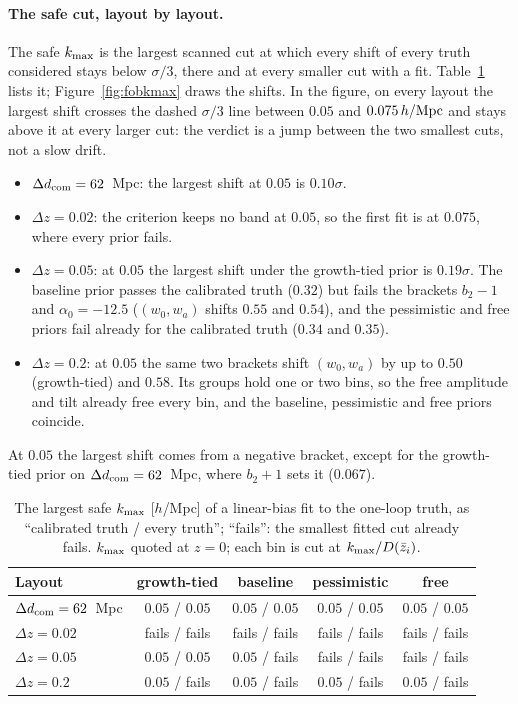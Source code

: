 \documentclass[11pt]{article}
\newcommand{\kmax}{k_{\rm max}}
\newcommand{\hMpc}{\,h/{\rm Mpc}}
\newcommand{\kmaxclause}{$\kmax$ quoted at $z = 0$; each bin is cut at
  $\kmax/D(\bar{z}_i)$.}
\begin{document}
\paragraph{The safe cut, layout by layout.}
The safe $\kmax$ is the largest scanned cut at which every shift of
every truth considered stays below $\sigma/3$, there and at every
smaller cut with a fit.  Table~\ref{tab:safe} lists it;
Figure~\ref{fig:fobkmax} draws the shifts.  In the figure, on every
layout the largest shift crosses the dashed $\sigma/3$ line between
$0.05$ and $0.075\hMpc$ and stays above it at every larger cut: the
verdict is a jump between the two smallest cuts, not a slow drift.
\begin{itemize}
  \item $\Delta d_{\rm com} = 62$~Mpc: the largest shift at $0.05$ is
    $0.10\sigma$.
  \item $\Delta z = 0.02$: the criterion keeps no band at $0.05$, so
    the first fit is at $0.075$, where every prior fails.
  \item $\Delta z = 0.05$: at $0.05$ the largest shift under the
    growth-tied prior is $0.19\sigma$.  The baseline prior passes the
    calibrated truth ($0.32$) but fails the brackets $b_2 - 1$ and
    $\alpha_0 = -12.5$ ($(w_0, w_a)$ shifts $0.55$ and $0.54$), and the
    pessimistic and free priors fail already for the calibrated truth
    ($0.34$ and $0.35$).
  \item $\Delta z = 0.2$: at $0.05$ the same two brackets shift
    $(w_0, w_a)$ by up to $0.50$ (growth-tied) and $0.58$.  Its groups hold one or two
    bins, so the free amplitude and tilt already free every bin, and
    the baseline, pessimistic and free priors coincide.
\end{itemize}
At $0.05$ the largest shift comes from a negative bracket, except for
the growth-tied prior on $\Delta d_{\rm com} = 62$~Mpc, where
$b_2 + 1$ sets it ($0.067$).

\begin{table}[ht]
  \centering
  \begin{tabular}{lcccc}
    \hline
    Layout & growth-tied & baseline & pessimistic & free \\
    \hline
    $\Delta d_{\rm com} = 62$~Mpc & $0.05$ / $0.05$ & $0.05$ / $0.05$
      & $0.05$ / $0.05$ & $0.05$ / $0.05$ \\
    $\Delta z = 0.02$ & fails / fails & fails / fails
      & fails / fails & fails / fails \\
    $\Delta z = 0.05$ & $0.05$ / $0.05$ & $0.05$ / fails
      & fails / fails & fails / fails \\
    $\Delta z = 0.2$ & $0.05$ / fails & $0.05$ / fails
      & $0.05$ / fails & $0.05$ / fails \\
    \hline
  \end{tabular}
  \caption{The largest safe $\kmax$ [$h$/Mpc] of a linear-bias fit to
    the one-loop truth, as ``calibrated truth / every truth'';
    ``fails'': the smallest fitted cut already fails.  \kmaxclause}
  \label{tab:safe}
\end{table}
\end{document}
